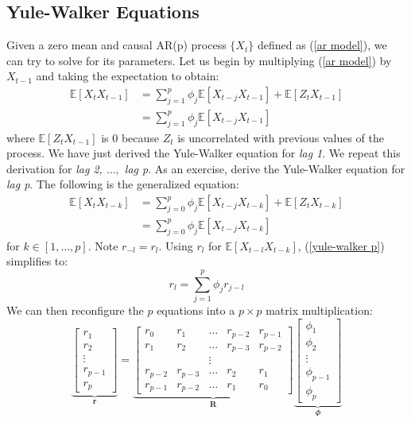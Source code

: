 \documentclass{article}
\begin{document}
\subsection{Yule-Walker Equations}
Given a zero mean and causal AR(p) process $\{X_t\}$ defined as (\ref{ar model}), we can try to solve for its parameters. Let us begin by multiplying (\ref{ar model}) by $X_{t-1}$ and taking the expectation to obtain:
\begin{align}\label{yule-walker 1}
    \mathbb{E}[X_t X_{t-1}] &= \sum_{j=1}^p \phi_j \mathbb{E} [X_{t-j} X_{t-1}] + \mathbb{E}[Z_t X_{t-1}] \nonumber\\
    &= \sum_{j=1}^p \phi_j \mathbb{E} [X_{t-j} X_{t-1}]
\end{align}
where $\mathbb{E}[Z_t X_{t-1}]$ is $0$ because $Z_t$ is uncorrelated with previous values of the process. We have just derived the Yule-Walker equation for \emph{lag 1}. We repeat this derivation for \emph{lag 2, $\ldots,$ lag p}. As an exercise, derive the Yule-Walker equation for \emph{lag p}. The following is the generalized equation:
\begin{align}\label{yule-walker p}
    \mathbb{E}[X_t X_{t-k}] &= \sum_{j=0}^p \phi_j \mathbb{E} [X_{t-j} X_{t-k}] + \mathbb{E}[Z_t X_{t-k}] \nonumber\\
    &= \sum_{j=0}^p \phi_j \mathbb{E} [X_{t-j} X_{t-k}]
\end{align}
for $k \in [1,\ldots, p]$. Note $r_{-l} = r_l$. Using $r_l$ for $\mathbb{E}[X_{t-l} X_{t-k}]$, (\ref{yule-walker p}) simplifies to:
\begin{equation}\label{yule walker simplified}
    r_l = \sum_{j=1}^p \phi_j r_{j-l}
\end{equation}
We can then reconfigure the $p$ equations into a $p\times p$ matrix multiplication:
\begin{equation}\label{yule-walker matrix}
    \underbrace{\begin{bmatrix}
        r_1\\
        r_2\\
        \vdots\\
        r_{p-1}\\
        r_p
    \end{bmatrix}}_{\textbf{r}}
    =
    \underbrace{\begin{bmatrix}
        r_0 & r_1 &\ldots & r_{p-2} & r_{p-1}\\
        r_1 & r_2 &\ldots & r_{p-3} & r_{p-2}\\
        &  & \vdots & &\\
        r_{p-2} & r_{p-3} & \ldots & r_2 & r_1\\
        r_{p-1} & r_{p-2} & \ldots & r_1 & r_0
    \end{bmatrix}}_{\textbf{R}}
    \underbrace{\begin{bmatrix}
        \phi_1 \\
        \phi_2 \\
        \vdots\\
        \phi_{p-1}\\
        \phi_p
    \end{bmatrix}}_{\textbf{$\Phi$}}
\end{equation}
\end{document}
